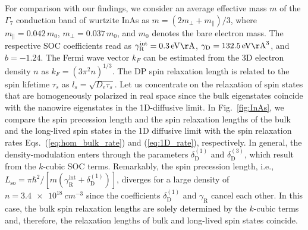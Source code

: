 \documentclass[superscriptaddress,noshowpacs,noshowkeys, twocolumn, floatfix,aps, prb,reprint]{revtex4-1}
\begin{document}
For comparison with our findings, we consider an average effective mass $m$ of the $\Gamma_7$ conduction band of wurtzite InAs as $m=(2m_\perp+m_\parallel)/3$, where $m_\parallel=0.042\, m_0$, $m_\perp=0.037 \,m_0$, and $m_0$ denotes the bare electron mass.\cite{FariaJunior2016,Campos2018}
The respective SOC coefficients read as $\gamma_\text{R}^\text{int}=\SI{0.3}{eV\AA}$, $\gamma_\text{D}=\SI{132.5}{eV\AA^3}$, and $b=-1.24$.\cite{Gmitra2016}
The Fermi wave vector $k_F$ can be estimated from the 3D electron density $n$ as $k_F=(3\pi^2 n)^{1/3}$.
The DP spin relaxation length is related to the spin lifetime $\tau_s$ as $l_s=\sqrt{D_e\tau_s}$.
Let us concentrate on the relaxation of spin states that are homogeneously polarized in real space since the bulk eigenstates coincide with the nanowire eigenstates in the 1D-diffusive limit.
In Fig.~\ref{fig:InAs}, we compare the spin precession length and the spin relaxation lengths of the bulk and the long-lived spin states in the 1D diffusive limit with the spin relaxation rates Eqs.~(\ref{eq:hom_bulk_rate}) and (\ref{eq:1D_rate}), respectively.
In general, the density-modulation enters through the parameters $\delta_\text{D}^{(1)}$ and $\delta_\text{D}^{(3)}$, which result from the $k$-cubic SOC terms.
Remarkably, the spin precession length, i.e., $L_\text{so}=\pi\hbar^2/[m(\gamma_\text{R}^\text{int}+\delta_\text{D}^{(1)})]$, diverges for a large density of $n=\SI{3.4e18}{cm^{-3}}$ since the coefficients $\delta_\text{D}^{(1)}$ and $\gamma_\text{R}$ cancel each other.
In this case, the bulk spin relaxation lengths are solely determined by the $k$-cubic terms and, therefore, the relaxation lengths of bulk and long-lived spin states coincide.
\end{document}
